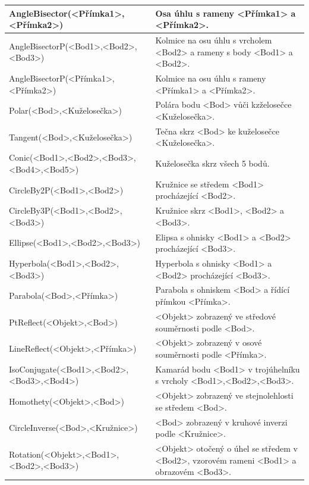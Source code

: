 \documentclass[11pt]{article}
\begin{document}
\begin{center}
\begin{tabularx}{\textwidth}{|l|X|}
            \hline
            AngleBisector(<Přímka1>,<Přímka2>) & Osa úhlu s rameny <Přímka1> a <Přímka2>. \\
            \hline
            AngleBisectorP(<Bod1>,<Bod2>,<Bod3>) & Kolmice na osu úhlu s vrcholem <Bod2> a rameny s body <Bod1> a <Bod2>. \\
            \hline
            AngleBisectorP(<Přímka1>,<Přímka2>) & Kolmice na osu úhlu s rameny <Přímka1> a <Přímka2>. \\
            \hline
            Polar(<Bod>,<Kuželosečka>) & Polára bodu <Bod> vůči kzželosečce <Kuželosečka>. \\
            \hline
            Tangent(<Bod>,<Kuželosečka>) & Tečna skrz <Bod> ke kuželosečce <Kuželosečka>. \\
            \hline
            Conic(<Bod1>,<Bod2>,<Bod3>,<Bod4>,<Bod5>) & Kuželosečka skrz všech 5 bodů. \\
            \hline
            CircleBy2P(<Bod1>,<Bod2>) & Kružnice se středem <Bod1> procházející <Bod2>. \\
            \hline
            CircleBy3P(<Bod1>,<Bod2>,<Bod3>) & Kružnice skrz <Bod1>, <Bod2> a <Bod3>. \\
            \hline
            Ellipse(<Bod1>,<Bod2>,<Bod3>) & Elipsa s ohnisky <Bod1> a <Bod2> procházející <Bod3>. \\
            \hline
            Hyperbola(<Bod1>,<Bod2>,<Bod3>) & Hyperbola s ohnisky <Bod1> a <Bod2> procházející <Bod3>. \\
            \hline
            Parabola(<Bod>,<Přímka>) & Parabola s ohniskem <Bod> a řídící přímkou <Přímka>. \\
            \hline
            PtReflect(<Objekt>,<Bod>) & <Objekt> zobrazený ve středové souměrnosti podle <Bod>. \\
            \hline
            LineReflect(<Objekt>,<Přímka>) & <Objekt> zobrazený v osové souměrnosti podle <Přímka>. \\
            \hline
            IsoConjugate(<Bod1>,<Bod2>,<Bod3>,<Bod4>) & Kamarád bodu <Bod1> v trojúhelníku s vrcholy <Bod1>,<Bod2>,<Bod3>. \\
            \hline
            Homothety(<Objekt>,<Bod>) & <Objekt> zobrazený ve stejnolehlosti se středem <Bod>. \\
            \hline
            CircleInverse(<Bod>,<Kružnice>) & <Bod> zobrazený v kruhové inverzi podle <Kružnice>. \\
            \hline
            Rotation(<Objekt>,<Bod1>,<Bod2>,<Bod3>) & <Objekt> otočený o úhel se středem v <Bod2>, vzorovém rameni <Bod1> a obrazovém <Bod3>. \\
            \hline
        \end{tabularx}
    \end{center}
\end{document}
